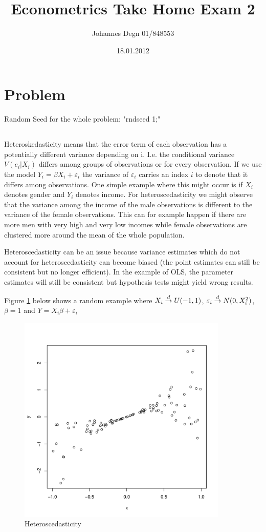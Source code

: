 \documentclass[11pt]{article}
\title{\textbf{Econometrics Take Home Exam 2}}
\author{Johannes Degn 01/848553}
\date{18.01.2012}
\theoremstyle{break}
\begin{document}
\maketitle


\section{Problem}
Random Seed for the whole problem: "rndseed 1;"

\subsection{}
Heteroskedasticity means that the error term of each observation has a potentially different variance depending on i. I.e. the conditional variance $V(e_i|X_i)$ differs among groups of observations or for every observation. If we use the model $Y_i = \beta X_i + \varepsilon_i$ the variance of $\varepsilon_i$ carries an index $i$ to denote that it differs among observations. One simple example where this might occur is if $X_i$ denotes gender and $Y_i$ denotes income. For heteroscedasticity we might observe that the variance among the income of the male observations is different to the variance of the female observations. This can for example happen if there are more men with very high and very low incomes while female observations are clustered more around the mean of the whole population.

Heteroscedasticity can be an issue because variance estimates which do not account for heteroscedasticity can become biased (the point estimates can still be consistent but no longer efficient). In the example of OLS, the parameter estimates will still be consistent but hypothesis tests might yield wrong results.

Figure \ref{heteroscedasticity} below shows a random example where $X_i \;{\buildrel d \over \rightarrow}\; U(-1, 1)$, $\varepsilon_i \;{\buildrel d \over \rightarrow}\; N(0, X_i^2)$, $\beta = 1$ and $Y = X_i\beta+\varepsilon_i$

\begin{figure}[H]
\centering
\includegraphics[height=100mm]{heteroscedasticity.pdf}
\caption{Heteroscedasticity}
\label{heteroscedasticity}
\end{figure}
\end{document}
